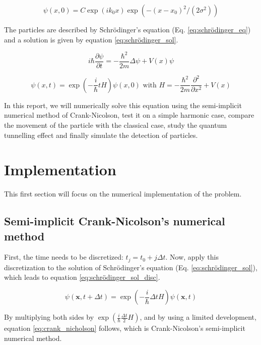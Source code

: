 \documentclass[a4paper,12pt,twoside]{article}
\newcommand{\mbf}[1]{\mathbf{#1}} %
\newcommand{\bracket}[1]{\left(#1\right)}
\newcommand{\lapl}[1]{\Delta#1}
\begin{document}
  \begin{equation}
    \psi(x,0) = C\exp(ik_0x)\exp(-(x-x_0)^2/(2\sigma^2))
    \label{eq:wave_packet}
  \end{equation}

  The particles are described by Schrödinger's equation (Eq. \eqref{eq:schrödinger_eq}) and a solution is given by equation \eqref{eq:schrödinger_sol}.

  \begin{equation}
    i\hbar\frac{\partial\psi}{\partial t} = -\frac{\hbar^2}{2m}\lapl{\psi} + V(x)\psi
    \label{eq:schrödinger_eq}
  \end{equation}

  \begin{equation}
    \psi(x,t) = \exp\bracket{-\frac{i}{\hbar}tH}\psi(x,0)\text{ with }H=-\frac{\hbar^2}{2m}\frac{\partial^2}{\partial x^2} + V(x)
    \label{eq:schrödinger_sol}
  \end{equation}

  In this report, we will numerically solve this equation using the semi-implicit numerical method of Crank-Nicolson, test it on a simple harmonic case, compare the movement of the particle with the classical case, study the quantum tunnelling effect and finally simulate the detection of particles.

\newpage
\section{Implementation}\label{sec:impl}
  This first section will focus on the numerical implementation of the problem.

  \subsection{Semi-implicit Crank-Nicolson's numerical method}
    First, the time needs to be discretized: $t_j = t_0 + j\Delta t$.
    Now, apply this discretization to the solution of Schrödinger's equation (Eq. \eqref{eq:schrödinger_sol}), which leads to equation \eqref{eq:schrödinger_sol_disc}.

    \begin{equation}
      \psi(\mbf{x}, t + \Delta t) = \exp\bracket{-\frac{i}{\hbar}\Delta t H}\psi(\mbf{x}, t)
      \label{eq:schrödinger_sol_disc}
    \end{equation}

    By multiplying both sides by $\exp\bracket{\frac{i}{\hbar}\frac{\Delta t}{2}H}$, and by using a limited development, equation \eqref{eq:crank_nicholson} follows, which is Crank-Nicolson's semi-implicit numerical method.
\end{document}

